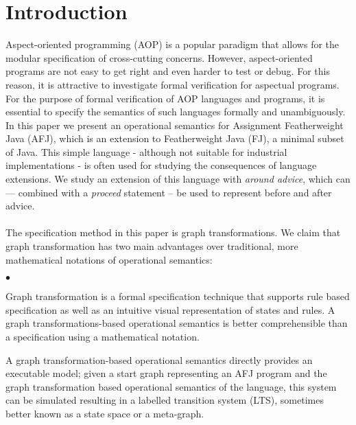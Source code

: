 \section{Introduction}

Aspect-oriented programming (AOP) \cite{DBLP:conf/ecoop/KiczalesLMMLLI97} is a popular para{\-}digm that allows for the modular specification of cross-cutting concerns. However, aspect-oriented programs are not easy to get right and even harder to test or debug. For this reason, it is attractive to investigate formal verification for aspectual programs. For the purpose of formal verification of AOP languages and programs, it is essential to specify the semantics of such languages formally and unambiguously.\\
In this paper we present an operational semantics for Assignment Featherweight Java (AFJ), which is an extension to Featherweight Java (FJ), a minimal subset of Java. This simple language - although not suitable for industrial implementations - is often used for studying the consequences of language extensions. We study an extension of this language with \emph{around advice}, which can  --- combined with a \emph{proceed} statement -- be used to represent before and after advice.\\
\\
The specification method in this paper is graph transformations. We claim that graph transformation has two main advantages over traditional, more mathematical notations of operational semantics:
\begin{list}{$\bullet$}{}
\item Graph transformation is a formal specification technique that supports rule based specification as well as an intuitive visual representation of states and rules.
A graph transformations-based operational semantics is better comprehensible than a specification using a mathematical notation.
\item A graph transformation-based operational semantics directly provides an executable model; given a start graph representing an AFJ program and the graph transformation based operational semantics of the language, this system can be simulated resulting in a labelled transition system (LTS), sometimes better known as a state space or a meta-graph.
\end{list}

